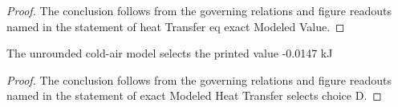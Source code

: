 \begin{proof}
  The conclusion follows from the governing relations and figure readouts named in the statement of heat Transfer eq exact Modeled Value.
\end{proof}
\begin{lemma}
  \label{lem:physics:phyx-mini-0460:phyxminiproblems-problemphyxmini0460-exactmodeledheattransfer-selects-choice-d}
  The unrounded cold-air model selects the printed value -0.0147 kJ
\end{lemma}
\begin{proof}
  The conclusion follows from the governing relations and figure readouts named in the statement of exact Modeled Heat Transfer selects choice D.
\end{proof}
